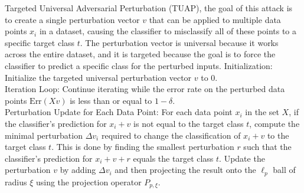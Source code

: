 Targeted Universal Adversarial Perturbation (TUAP), the goal of this attack is to create a single perturbation vector $v$ that can be applied to multiple data points $x_i$ in a dataset, causing the classifier to misclassify all of these points to a specific target class $t$. The perturbation vector is universal because it works across the entire dataset, and it is targeted because the goal is to force the classifier to predict a specific class for the perturbed inputs.
Initialization: Initialize the targeted universal perturbation vector $ v $ to 0. \\
Iteration Loop: Continue iterating while the error rate on the perturbed data points $ \text{Err}(Xv) $ is less than or equal to $ 1 - \delta $. \\
Perturbation Update for Each Data Point: For each data point $ x_i $ in the set $ X $, if the classifier's prediction for $ x_i + v $ is not equal to the target class $ t $, compute the minimal perturbation $ \Delta v_i $ required to change the classification of $ x_i + v $ to the target class $ t $. This is done by finding the smallest perturbation $ r $ such that the classifier's prediction for $ x_i + v + r $ equals the target class $ t $. Update the perturbation $ v $ by adding $ \Delta v_i $ and then projecting the result onto the $ \ell_p $ ball of radius $ \xi $ using the projection operator $ P_{p, \xi} $.